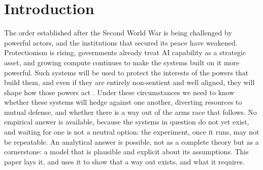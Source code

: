 \documentclass[manuscript,screen,review]{jair}
\begin{document}
\begin{abstract}
The same asymmetry that blocks full real-time peer simulation lets weak institutions govern. An institution that merely keeps an authenticated public record, and can enforce nothing itself, supplies the common signals that stable cooperation needs. Human institutions can fill this role for systems far more capable than themselves, provided the three conditions hold.

{\bf Conclusions:}
Stable coordination among autonomous AI systems is possible in principle but far from automatic, and whether it emerges depends on measurable quantities, not on hope. Those quantities can still be shaped while AI systems act through infrastructure that people control; once autonomous operation begins, that window closes.
\end{abstract}



\maketitle

\section{Introduction}
\label{sec:intro}

The order established after the Second World War is being challenged by powerful actors, and the institutions that secured its peace have weakened. Protectionism is rising, governments already treat AI capability as a strategic asset, and growing compute continues to make the systems built on it more powerful. Such systems will be used to protect the interests of the powers that build them, and even if they are entirely non-sentient and well aligned, they will shape how those powers act \cite{harari.2024}. Under these circumstances we need to know whether these systems will hedge against one another, diverting resources to mutual defense, and whether there is a way out of the arms race that follows. No empirical answer is available, because the systems in question do not yet exist, and waiting for one is not a neutral option: the experiment, once it runs, may not be repeatable. An analytical answer is possible, not as a complete theory but as a cornerstone: a model that is plausible and explicit about its assumptions. This paper lays it, and uses it to show that a way out exists, and what it requires.
\end{document}
